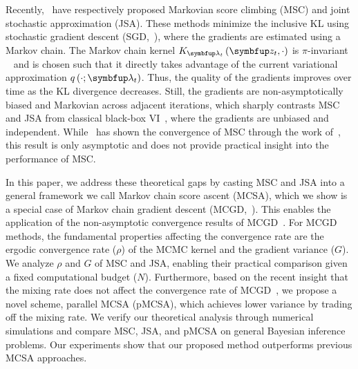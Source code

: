 Recently,~\citet{NEURIPS2020_b2070693,pmlr-v124-ou20a} have respectively proposed Markovian score climbing (MSC) and joint stochastic approximation (JSA).
These methods minimize the inclusive KL using stochastic gradient descent (SGD,~\citealt{robbins_stochastic_1951}), where the gradients are estimated using a Markov chain.
The Markov chain kernel \(K_{\vlambda_t}\left(\vz_t, \cdot\right)\) is \(\pi\)-invariant ~\citep{robert_monte_2004} and is chosen such that it directly takes advantage of the current variational approximation \(q\left(\cdot; \vlambda_t\right)\).
Thus, the quality of the gradients improves over time as the KL divergence decreases.
Still, the gradients are non-asymptotically biased and Markovian across adjacent iterations, which sharply contrasts MSC and JSA from classical black-box VI~\citep{pmlr-v33-ranganath14, JMLR:v18:16-107}, where the gradients are unbiased and independent.
While~\citet{NEURIPS2020_b2070693} has shown the convergence of MSC through the work of~\citet{gu_stochastic_1998}, this result is only asymptotic and does not provide practical insight into the performance of MSC.

%

In this paper, we address these theoretical gaps by casting MSC and JSA into a general framework we call Markov chain score ascent (MCSA), which we show is a special case of Markov chain gradient descent (MCGD,~\citealt{duchi_ergodic_2012}).
This enables the application of the non-asymptotic convergence results of MCGD~\citep{duchi_ergodic_2012, NEURIPS2018_1371bcce, pmlr-v99-karimi19a, doan_finitetime_2020, doan_convergence_2020, Xiong_Xu_Liang_Zhang_2021, debavelaere_convergence_2021}.
For MCGD methods, the fundamental properties affecting the convergence rate are the ergodic convergence rate (\(\rho\)) of the MCMC kernel and the gradient variance (\(G\)).
We analyze \(\rho\) and \(G\) of MSC and JSA, enabling their practical comparison given a fixed computational budget (\(N\)).
Furthermore, based on the recent insight that the mixing rate does not affect the convergence rate of MCGD~\citet{doan_convergence_2020,doan_finitetime_2020}, we propose a novel scheme, parallel MCSA (pMCSA), which achieves lower variance by trading off the mixing rate.
We verify our theoretical analysis through numerical simulations and compare MSC, JSA, and pMCSA on general Bayesian inference problems.
Our experiments show that our proposed method outperforms previous MCSA approaches.

